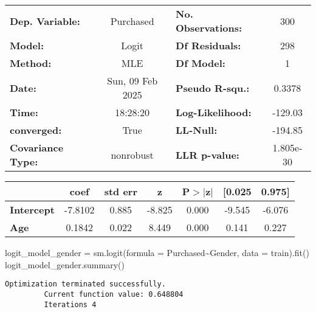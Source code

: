 \documentclass[
  letterpaper,
  DIV=11,
  numbers=noendperiod]{scrreprt}
\newenvironment{Shaded}{\begin{snugshade}}{\end{snugshade}}
\newcommand{\NormalTok}[1]{\textcolor[rgb]{0.00,0.23,0.31}{#1}}
\newcommand{\OperatorTok}[1]{\textcolor[rgb]{0.37,0.37,0.37}{#1}}
\newcommand{\StringTok}[1]{\textcolor[rgb]{0.13,0.47,0.30}{#1}}
\begin{document}
\begin{center}
\begin{tabular}{lclc}
\toprule
\textbf{Dep. Variable:}   &    Purchased     & \textbf{  No. Observations:  } &      300    \\
\textbf{Model:}           &      Logit       & \textbf{  Df Residuals:      } &      298    \\
\textbf{Method:}          &       MLE        & \textbf{  Df Model:          } &        1    \\
\textbf{Date:}            & Sun, 09 Feb 2025 & \textbf{  Pseudo R-squ.:     } &   0.3378    \\
\textbf{Time:}            &     18:28:20     & \textbf{  Log-Likelihood:    } &   -129.03   \\
\textbf{converged:}       &       True       & \textbf{  LL-Null:           } &   -194.85   \\
\textbf{Covariance Type:} &    nonrobust     & \textbf{  LLR p-value:       } & 1.805e-30   \\
\bottomrule
\end{tabular}
\begin{tabular}{lcccccc}
                   & \textbf{coef} & \textbf{std err} & \textbf{z} & \textbf{P$> |$z$|$} & \textbf{[0.025} & \textbf{0.975]}  \\
\midrule
\textbf{Intercept} &      -7.8102  &        0.885     &    -8.825  &         0.000        &       -9.545    &       -6.076     \\
\textbf{Age}       &       0.1842  &        0.022     &     8.449  &         0.000        &        0.141    &        0.227     \\
\bottomrule
\end{tabular}
\end{center}

\begin{Shaded}
\begin{Highlighting}[]
\NormalTok{logit\_model\_gender }\OperatorTok{=}\NormalTok{ sm.logit(formula }\OperatorTok{=} \StringTok{\textquotesingle{}Purchased\textasciitilde{}Gender\textquotesingle{}}\NormalTok{, data }\OperatorTok{=}\NormalTok{ train).fit()}
\NormalTok{logit\_model\_gender.summary()}
\end{Highlighting}
\end{Shaded}

\begin{verbatim}
Optimization terminated successfully.
         Current function value: 0.648804
         Iterations 4
\end{verbatim}
\end{document}
